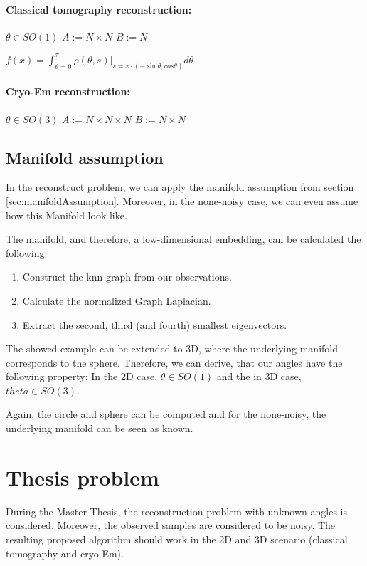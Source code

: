 \paragraph{Classical tomography reconstruction:}

$\theta \in SO(1)$
$A := N \times N$
$B := N$

$f(x) = \int_{\theta = 0}^{\pi} \rho(\theta, s) |_{s=x \cdot (- \sin \theta, cos \theta) } d \theta$



\paragraph{Cryo-Em reconstruction:}

$\theta \in SO(3)$
$A := N \times N \times N$
$B := N \times N$



\subsection{Manifold assumption}
In the reconstruct problem, we can apply the manifold assumption from section \ref{sec:manifoldAssumption}.
Moreover, in the none-noisy case, we can even assume how this Manifold look like.

The manifold, and therefore, a low-dimensional embedding, can be calculated the following:

\begin{enumerate}
    \item Construct the knn-graph from our observations.
    \item Calculate the normalized Graph Laplacian.
    \item Extract the second, third (and fourth) smallest eigenvectors.
\end{enumerate}

The showed example can be extended to 3D, where the underlying manifold corresponds to the sphere.
Therefore, we can derive, that our angles have the following property:
In the 2D case, $\theta \in SO(1)$ and the in 3D case, $theta \in SO(3)$.







Again, the circle and sphere can be computed and for the none-noisy, the underlying manifold can be seen as known.


\section{Thesis problem}
During the Master Thesis, the reconstruction problem with unknown angles is considered. 
Moreover, the observed samples are considered to be noisy. 
The resulting proposed algorithm should work in the 2D and 3D scenario (classical tomography and cryo-Em).

